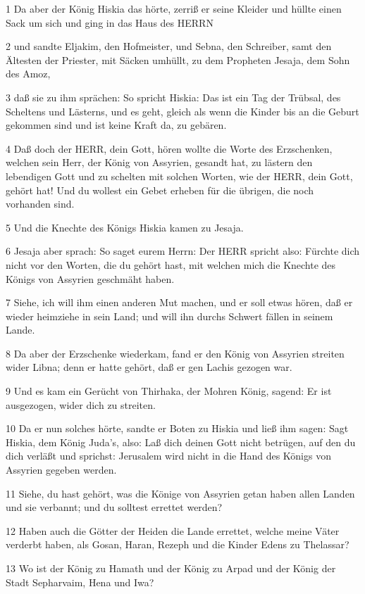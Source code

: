 \par 1 Da aber der König Hiskia das hörte, zerriß er seine Kleider und hüllte einen Sack um sich und ging in das Haus des HERRN
\par 2 und sandte Eljakim, den Hofmeister, und Sebna, den Schreiber, samt den Ältesten der Priester, mit Säcken umhüllt, zu dem Propheten Jesaja, dem Sohn des Amoz,
\par 3 daß sie zu ihm sprächen: So spricht Hiskia: Das ist ein Tag der Trübsal, des Scheltens und Lästerns, und es geht, gleich als wenn die Kinder bis an die Geburt gekommen sind und ist keine Kraft da, zu gebären.
\par 4 Daß doch der HERR, dein Gott, hören wollte die Worte des Erzschenken, welchen sein Herr, der König von Assyrien, gesandt hat, zu lästern den lebendigen Gott und zu schelten mit solchen Worten, wie der HERR, dein Gott, gehört hat! Und du wollest ein Gebet erheben für die übrigen, die noch vorhanden sind.
\par 5 Und die Knechte des Königs Hiskia kamen zu Jesaja.
\par 6 Jesaja aber sprach: So saget eurem Herrn: Der HERR spricht also: Fürchte dich nicht vor den Worten, die du gehört hast, mit welchen mich die Knechte des Königs von Assyrien geschmäht haben.
\par 7 Siehe, ich will ihm einen anderen Mut machen, und er soll etwas hören, daß er wieder heimziehe in sein Land; und will ihn durchs Schwert fällen in seinem Lande.
\par 8 Da aber der Erzschenke wiederkam, fand er den König von Assyrien streiten wider Libna; denn er hatte gehört, daß er gen Lachis gezogen war.
\par 9 Und es kam ein Gerücht von Thirhaka, der Mohren König, sagend: Er ist ausgezogen, wider dich zu streiten.
\par 10 Da er nun solches hörte, sandte er Boten zu Hiskia und ließ ihm sagen: Sagt Hiskia, dem König Juda's, also: Laß dich deinen Gott nicht betrügen, auf den du dich verläßt und sprichst: Jerusalem wird nicht in die Hand des Königs von Assyrien gegeben werden.
\par 11 Siehe, du hast gehört, was die Könige von Assyrien getan haben allen Landen und sie verbannt; und du solltest errettet werden?
\par 12 Haben auch die Götter der Heiden die Lande errettet, welche meine Väter verderbt haben, als Gosan, Haran, Rezeph und die Kinder Edens zu Thelassar?
\par 13 Wo ist der König zu Hamath und der König zu Arpad und der König der Stadt Sepharvaim, Hena und Iwa?
